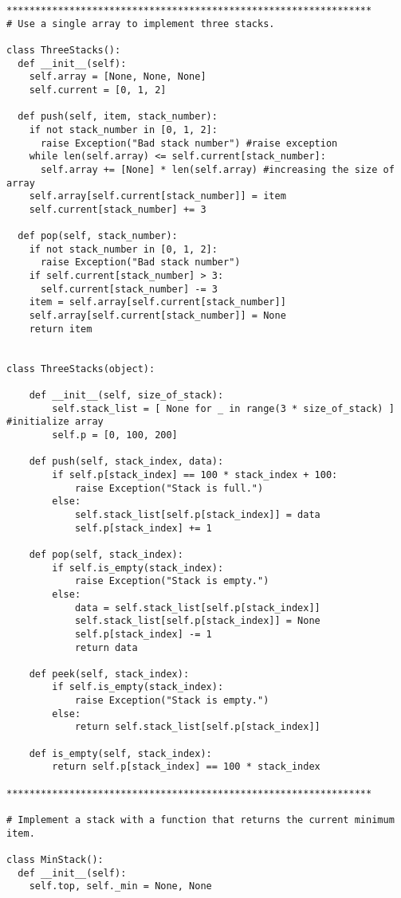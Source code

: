 \documentclass[12pt]{article}
\begin{document}
\begin{lstlisting}
****************************************************************
# Use a single array to implement three stacks.

class ThreeStacks():
  def __init__(self):
    self.array = [None, None, None]
    self.current = [0, 1, 2]
  
  def push(self, item, stack_number):
    if not stack_number in [0, 1, 2]:
      raise Exception("Bad stack number") #raise exception
    while len(self.array) <= self.current[stack_number]:
      self.array += [None] * len(self.array) #increasing the size of array
    self.array[self.current[stack_number]] = item
    self.current[stack_number] += 3
  
  def pop(self, stack_number):
    if not stack_number in [0, 1, 2]:
      raise Exception("Bad stack number")
    if self.current[stack_number] > 3:
      self.current[stack_number] -= 3
    item = self.array[self.current[stack_number]]
    self.array[self.current[stack_number]] = None
    return item


class ThreeStacks(object):

    def __init__(self, size_of_stack):
        self.stack_list = [ None for _ in range(3 * size_of_stack) ] #initialize array
        self.p = [0, 100, 200]

    def push(self, stack_index, data):
        if self.p[stack_index] == 100 * stack_index + 100:
            raise Exception("Stack is full.")
        else:
            self.stack_list[self.p[stack_index]] = data
            self.p[stack_index] += 1

    def pop(self, stack_index):
        if self.is_empty(stack_index):
            raise Exception("Stack is empty.")
        else:
            data = self.stack_list[self.p[stack_index]]
            self.stack_list[self.p[stack_index]] = None
            self.p[stack_index] -= 1
            return data

    def peek(self, stack_index):
        if self.is_empty(stack_index):
            raise Exception("Stack is empty.")
        else:
            return self.stack_list[self.p[stack_index]]

    def is_empty(self, stack_index):
        return self.p[stack_index] == 100 * stack_index

****************************************************************

# Implement a stack with a function that returns the current minimum item.

class MinStack():
  def __init__(self):
    self.top, self._min = None, None
    

\end{lstlisting}
\end{document}

